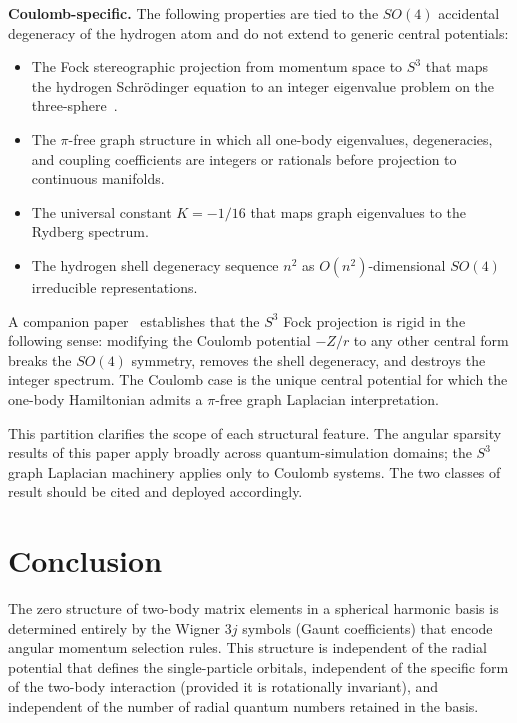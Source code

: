 \documentclass[twocolumn,pra,amsmath,amssymb,superscriptaddress]{revtex4-2}
\begin{document}
\medskip
\noindent\textbf{Coulomb-specific.}
The following properties are tied to the $SO(4)$ accidental
degeneracy of the hydrogen atom and do not extend to generic central
potentials:
\begin{itemize}
\item The Fock stereographic projection from momentum space to $S^3$
  that maps the hydrogen Schr\"odinger equation to an integer
  eigenvalue problem on the three-sphere~\cite{GeoVac_Paper7}.
\item The $\pi$-free graph structure in which all one-body
  eigenvalues, degeneracies, and coupling coefficients are
  integers or rationals before projection to continuous manifolds.
\item The universal constant $K = -1/16$ that maps graph eigenvalues
  to the Rydberg spectrum.
\item The hydrogen shell degeneracy sequence $n^2$ as
  $O(n^2)$-dimensional $SO(4)$ irreducible representations.
\end{itemize}
A companion paper~\cite{GeoVac_Paper23} establishes that the $S^3$
Fock projection is rigid in the following sense: modifying the
Coulomb potential $-Z/r$ to any other central form breaks the
$SO(4)$ symmetry, removes the shell degeneracy, and destroys the
integer spectrum.  The Coulomb case is the unique central potential
for which the one-body Hamiltonian admits a $\pi$-free graph
Laplacian interpretation.

\medskip
This partition clarifies the scope of each structural feature.  The
angular sparsity results of this paper apply broadly across
quantum-simulation domains; the $S^3$ graph Laplacian machinery
applies only to Coulomb systems.  The two classes of result should
be cited and deployed accordingly.

\section{Conclusion}
\label{sec:conclusion}

The zero structure of two-body matrix elements in a spherical
harmonic basis is determined entirely by the Wigner 3$j$ symbols
(Gaunt coefficients) that encode angular momentum selection rules.
This structure is independent of the radial potential that defines
the single-particle orbitals, independent of the specific form of
the two-body interaction (provided it is rotationally invariant),
and independent of the number of radial quantum numbers retained in
the basis.
\end{document}
